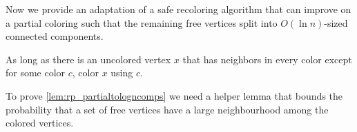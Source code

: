 Now we provide an adaptation of a safe recoloring algorithm that can improve on a partial coloring such that the remaining free vertices split into $O(\ln{n})$-sized connected components.

\begin{algorithm}[H]
    As long as there is an uncolored vertex $x$ that has neighbors in every color except for some color $c$, color $x$ using $c$. 
    \protect\caption{\label{alg:rp_saferecoloring} Safe Recoloring Algorithm (Adaptation of Algorithm 6 of \cite{MR3536556-David16})}
\end{algorithm}


To prove \cref{lem:rp_partialtologncomps} we need a helper lemma that bounds the probability that a set of free vertices have a large neighbourhood among the colored vertices.

